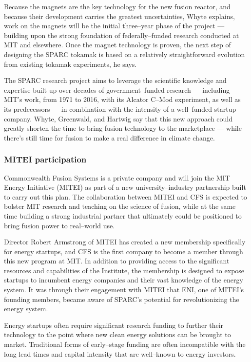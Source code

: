 \documentclass[a4paper,openany,12pt]{report}
\begin{document}
Because the magnets are the key technology for the new fusion reactor, and because their development carries the greatest uncertainties, Whyte explains, work on the magnets will be the initial three--year phase of the project --- building upon the strong foundation of federally--funded research conducted at MIT and elsewhere. Once the magnet technology is proven, the next step of designing the SPARC tokamak is based on a relatively straightforward evolution from existing tokamak experiments, he says.

The SPARC research project aims to leverage the scientific knowledge and expertise built up over decades of government--funded research --- including MIT's work, from 1971 to 2016, with its Alcator C--Mod experiment, as well as its predecessors --- in combination with the intensity of a well--funded startup company. Whyte, Greenwald, and Hartwig say that this new approach could greatly shorten the time to bring fusion technology to the marketplace --- while there's still time for fusion to make a real difference in climate change.

\subsubsection{MITEI participation}

Commonwealth Fusion Systems is a private company and will join the MIT Energy Initiative (MITEI) as part of a new university--industry partnership built to carry out this plan. The collaboration between MITEI and CFS is expected to bolster MIT research and teaching on the science of fusion, while at the same time building a strong industrial partner that ultimately could be positioned to bring fusion power to real--world use.

 Director Robert Armstrong of MITEI has created a new membership specifically for energy startups, and CFS is the first company to become a member through this new program at MIT. In addition to providing access to the significant resources and capabilities of the Institute, the membership is designed to expose startups to incumbent energy companies and their vast knowledge of the energy system. It was through their engagement with MITEI that ENI, one of MITEI's founding members, became aware of SPARC's potential for revolutionizing the energy system.

Energy startups often require significant research funding to further their technology to the point where new clean energy solutions can be brought to market. Traditional forms of early--stage funding are often incompatible with the long lead times and capital intensity that are well--known to energy investors.
\end{document}
